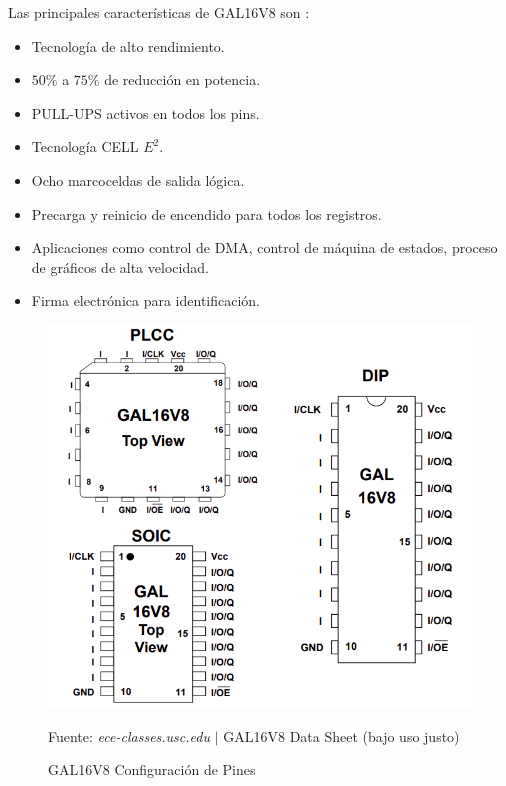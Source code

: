 \documentclass{article}
\begin{document}
    Las principales características de GAL16V8 son
    \cite{lattice-semiconductor-corp-2004}:

    \begin{itemize}
        \item Tecnología de alto rendimiento.
        \item $50\%$ a $75\%$ de reducción en potencia.
        \item PULL-UPS activos en todos los pins.
        \item Tecnología CELL $E^2$.
        \item Ocho marcoceldas de salida lógica.
        \item Precarga y reinicio de encendido para todos los registros.
        \item Aplicaciones como control de DMA, control de máquina de
        estados, proceso de gráficos de alta velocidad.
        \item Firma electrónica para identificación.
    \end{itemize}


    \begin{figure}[H]
        \centering
        \includegraphics[width=0.5\paperwidth]{images/datasheet-gal16v8-pins}
        \caption{GAL16V8 Configuración de Pines}\footnotesize
        Fuente: \textit{ece-classes.usc.edu} $\mid$ GAL16V8 Data Sheet
        \cite{lattice-semiconductor-corp-2004} (bajo uso justo)
    \end{figure}
\end{document}
